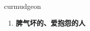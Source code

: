 
\begin{frame}
{\huge curmudgeon}
\begin{center}
\begin{enumerate}\Large
  \item \textbf{脾气坏的、爱抱怨的人}
\end{enumerate}
\end{center}
\end{frame}
